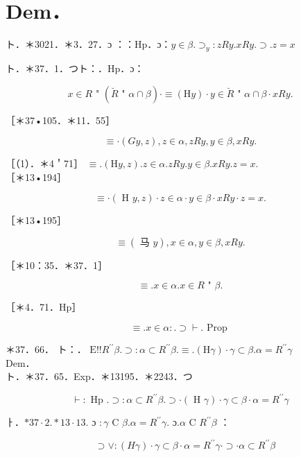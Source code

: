\documentclass[10pt]{article}
\begin{document}
\section*{Dem．}
ト．＊3021．＊3．27．ɔ ：：Hp．ɔ：$y \in \beta . \supset_{y}: z R y . x R y . \supset . z=x$

ト．＊37．1．つト：．Hp．ɔ：


\begin{equation*}
x \in R \text { " }(\breve{R} \text { " } \alpha \cap \beta) \cdot \equiv(\mathrm{H} y) \cdot y \in \breve{R} \text { " } \alpha \cap \beta \cdot x R y . \tag{1}
\end{equation*}


［＊37•105．＊11．55］

$$
\equiv \cdot(G y, z), z \in \alpha, z R y, y \in \beta, x R y .
$$

［（1）．＊4＇71］ $\equiv .(\mathrm{H} y, z) . z \in \alpha . z R y . y \in \beta . x R y . z=x$.\\
［＊13•194］

$$
\equiv \cdot(\text { H } y, z) \cdot z \in \alpha \cdot y \in \beta \cdot x R y \cdot z=x .
$$

［＊13•195］

$$
\equiv(\text { 马 } y), x \in \alpha, y \in \beta, x R y .
$$

［＊10：35．＊37．1］

$$
\equiv . x \in \alpha . x \in R \text { " } \beta .
$$

［＊4．71．Hp］

$$
\equiv . x \in \alpha: . \supset \vdash . \text { Prop }
$$

＊37．66． ト：． $\mathrm{E}!!R^{\prime \prime} \beta . \supset: \alpha \subset R^{\prime \prime} \beta . \equiv .(\mathrm{H} \gamma) \cdot \gamma \subset \beta . \alpha=R^{\prime \prime} \gamma$\\
Dem．\\
ト．＊37．65．Exp．＊13195．＊2243．つ


\begin{equation*}
\vdash: \text { Hp } . \supset: \alpha \subset R^{\prime \prime} \beta . \supset \cdot(\text { H } \gamma) \cdot \gamma \subset \beta \cdot \alpha=R^{\prime \prime} \gamma \tag{1}
\end{equation*}


ㅏ．$* 37 \cdot 2 . * 13 \cdot 13$. ɔ $: \gamma$ C $\beta . \alpha=R^{\prime \prime} \gamma$. ɔ.$\alpha$ C $R^{\prime \prime} \beta$ ：


\begin{equation*}
[* 10 \cdot 11 \cdot 23] \quad \supset \vee:(H \gamma) \cdot \gamma \subset \beta \cdot \alpha=R^{\prime \prime} \gamma \cdot \supset \cdot \alpha \subset R^{\prime \prime} \beta \tag{2}
\end{equation*}
\end{document}
